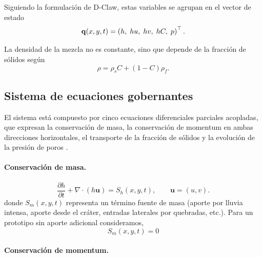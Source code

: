 Siguiendo la formulación de D-Claw, estas variables se agrupan en el vector de estado
\begin{equation}
    \mathbf{q}(x,y,t) = \left(h,\; hu,\; hv,\; hC,\; p\right)^{\top}.
    \label{eq:vector_estado}
\end{equation}

La densidad de la mezcla no es constante, sino que depende de la fracción de sólidos según
\begin{equation}
    \rho = \rho_s C + (1-C)\rho_f.
    \label{eq:densidad_mezcla}
\end{equation}

\subsection{Sistema de ecuaciones gobernantes}
\label{subsec:ecuaciones}

El sistema está compuesto por cinco ecuaciones diferenciales parciales acopladas, que expresan la conservación de masa, la conservación de momentum en ambas direcciones horizontales, el transporte de la fracción de sólidos y la evolución de la presión de poros \cite{iverson2014depth,george2025d}.

\paragraph{Conservación de masa.}
\begin{equation}
      \frac{\partial h}{\partial t} + \nabla\cdot(h\mathbf{u}) = S_h(x,y,t),
    \qquad \mathbf{u} = (u, v).
    \label{eq:masa}
\end{equation}
donde $S_m(x,y,t)$ representa un término fuente de masa (aporte por lluvia intensa, aporte desde el cráter, entradas laterales por quebradas, etc.). Para un prototipo sin aporte adicional consideramos,
\begin{equation}
    S_m(x,y,t) = 0
    \label{eq:smcero}
\end{equation}

\paragraph{Conservación de momentum.}

